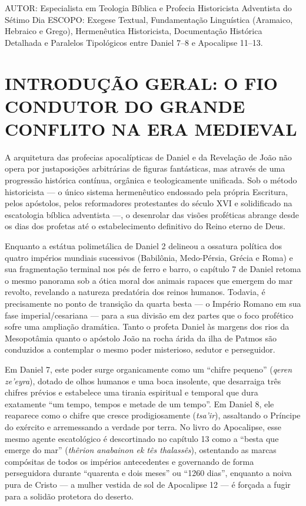 \documentclass[11pt,a4paper,openany]{book}
\begin{document}
AUTOR: Especialista em Teologia Bíblica e Profecia Historicista Adventista do Sétimo Dia
ESCOPO: Exegese Textual, Fundamentação Linguística (Aramaico, Hebraico e Grego), Hermenêutica Historicista, Documentação Histórica Detalhada e Paralelos Tipológicos entre Daniel 7–8 e Apocalipse 11–13.


\section{INTRODUÇÃO GERAL: O FIO CONDUTOR DO GRANDE CONFLITO NA ERA MEDIEVAL}


A arquitetura das profecias apocalípticas de Daniel e da Revelação de João não opera por justaposições arbitrárias de figuras fantásticas, mas através de uma progressão histórica contínua, orgânica e teologicamente unificada. Sob o método historicista — o único sistema hermenêutico endossado pela própria Escritura, pelos apóstolos, pelos reformadores protestantes do século XVI e solidificado na escatologia bíblica adventista —, o desenrolar das visões proféticas abrange desde os dias dos profetas até o estabelecimento definitivo do Reino eterno de Deus.

Enquanto a estátua polimetálica de Daniel 2 delineou a ossatura política dos quatro impérios mundiais sucessivos (Babilônia, Medo-Pérsia, Grécia e Roma) e sua fragmentação terminal nos pés de ferro e barro, o capítulo 7 de Daniel retoma o mesmo panorama sob a ótica moral dos animais rapaces que emergem do mar revolto, revelando a natureza predatória dos reinos humanos. Todavia, é precisamente no ponto de transição da quarta besta — o Império Romano em sua fase imperial/cesariana — para a sua divisão em dez partes que o foco profético sofre uma ampliação dramática. Tanto o profeta Daniel às margens dos rios da Mesopotâmia quanto o apóstolo João na rocha árida da ilha de Patmos são conduzidos a contemplar o mesmo poder misterioso, sedutor e perseguidor.

Em Daniel 7, este poder surge organicamente como um ``chifre pequeno'' (\textit{qeren ze'eyra}), dotado de olhos humanos e uma boca insolente, que desarraiga três chifres prévios e estabelece uma tirania espiritual e temporal que dura exatamente ``um tempo, tempos e metade de um tempo''. Em Daniel 8, ele reaparece como o chifre que cresce prodigiosamente (\textit{tsa'ir}), assaltando o Príncipe do exército e arremessando a verdade por terra. No livro do Apocalipse, esse mesmo agente escatológico é descortinado no capítulo 13 como a ``besta que emerge do mar'' (\textit{thêrion anabainon ek tês thalassês}), ostentando as marcas compósitas de todos os impérios antecedentes e governando de forma perseguidora durante ``quarenta e dois meses'' ou ``1260 dias'', enquanto a noiva pura de Cristo — a mulher vestida de sol de Apocalipse 12 — é forçada a fugir para a solidão protetora do deserto.
\end{document}
